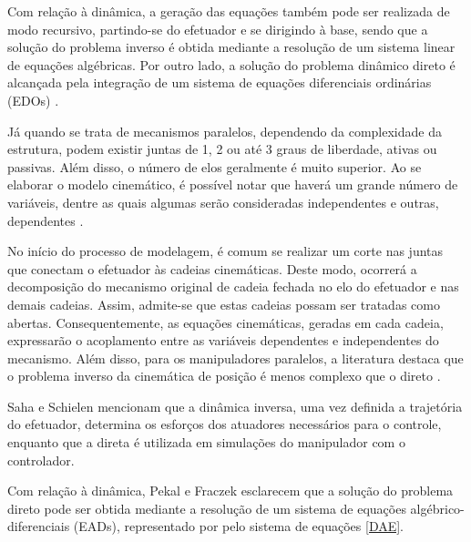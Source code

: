 \documentclass[]{politex}
\begin{document}
Com relação à dinâmica, a geração das equações também pode ser realizada de modo recursivo, partindo-se do efetuador e se dirigindo à base, sendo que a solução do problema inverso é obtida mediante a resolução de um sistema linear de equações algébricas. Por outro lado, a solução do problema dinâmico direto é alcançada pela integração de um sistema de equações diferenciais ordinárias (EDOs) \cite{Featherstone}.





Já quando se trata de mecanismos paralelos, dependendo da complexidade da estrutura, podem existir juntas de 1, 2 ou até 3 graus de liberdade, ativas ou passivas. Além disso, o número de elos geralmente é muito superior. Ao se elaborar o modelo cinemático, é possível notar que haverá um grande número de variáveis, dentre as quais algumas serão consideradas independentes e outras, dependentes \cite{Merlet}.

No início do processo de modelagem, é comum  se realizar um corte nas juntas que conectam o efetuador às cadeias cinemáticas. Deste modo, ocorrerá a decomposição do mecanismo original de cadeia fechada no elo do efetuador e nas demais cadeias. Assim, admite-se que estas cadeias possam ser tratadas como abertas. Consequentemente, as equações cinemáticas, geradas em cada cadeia, expressarão o acoplamento entre as variáveis dependentes e independentes do mecanismo. Além disso, para os manipuladores paralelos, a literatura destaca que o problema inverso da cinemática de posição é menos complexo que o direto \cite{Merlet}. 

Saha e Schielen \cite{Saha} mencionam que a dinâmica inversa, uma vez definida a trajetória do efetuador, determina os esforços dos atuadores necessários para o controle, enquanto que a direta é utilizada em simulações do manipulador com o controlador.

Com relação à dinâmica, Pekal e Fraczek \cite{Pekal2} esclarecem que a solução do problema direto pode ser obtida mediante a resolução de um sistema de equações algébrico-diferenciais (EADs), representado por pelo sistema de equações \eqref{DAE}.
\end{document}

